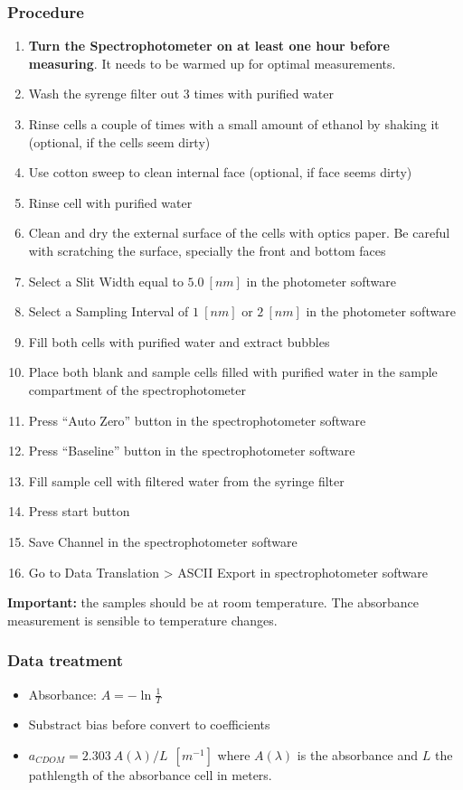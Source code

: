 \begin{appendices}
\subsubsection{Procedure}
\begin{enumerate}
  \item \textbf{Turn the Spectrophotometer on at least one hour before measuring}. It needs to be warmed up for optimal measurements.
  \item Wash the syrenge filter out 3 times with purified water
  \item Rinse cells a couple of times with a small amount of ethanol by shaking it (optional, if the cells seem dirty)
  \item Use cotton sweep to clean internal face (optional, if face seems dirty)
  \item Rinse cell with purified water
  \item Clean and dry the external surface of the cells with optics paper. Be careful with scratching the surface, specially the front and bottom faces
  \item Select a Slit Width equal to $5.0~[nm]$ in the photometer software
  \item Select a Sampling Interval of $1~[nm]$ or $2~[nm]$ in the photometer software
  \item Fill both cells with purified water and extract bubbles
  \item Place both blank and sample cells filled with purified water in the sample compartment of the spectrophotometer
  \item Press ``Auto Zero'' button in the spectrophotometer software
  \item Press ``Baseline'' button in the spectrophotometer software
  \item Fill sample cell with filtered water from the syringe filter
  \item Press start button
  \item Save Channel in the spectrophotometer software
  \item Go to Data Translation > ASCII Export in spectrophotometer software
\end{enumerate}
\textbf{Important:} the samples should be at room temperature. The absorbance measurement is sensible to temperature changes.
\subsubsection{Data treatment}
\begin{itemize}
  \item Absorbance: $A=-\ln{\displaystyle\frac{1}{T}}$ 
  \item Substract bias before convert to coefficients
  \item $a_{CDOM}=2.303~A(\lambda)/L~~[m^{-1}]$ where $A(\lambda)$ is the absorbance and $L$ the pathlength of the absorbance cell in meters.
\end{itemize}

\end{appendices}
